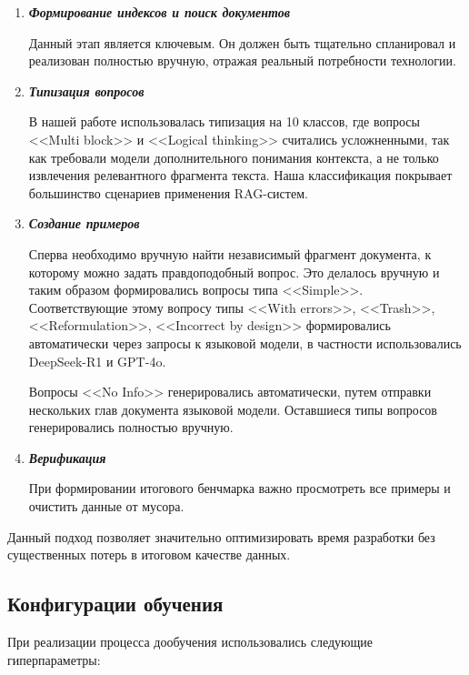 \begin{enumerate}
    \item \textbf{\textit{Формирование индексов и поиск документов}}

        Данный этап является ключевым. Он должен быть тщательно спланировал и реализован полностью вручную, отражая реальный потребности технологии.

    \item \textbf{\textit{Типизация вопросов}}

        В нашей работе использовалась типизация на 10 классов, где вопросы <<Multi block>> и <<Logical thinking>> считались усложненными, так как требовали модели дополнительного понимания контекста, а не только извлечения релевантного фрагмента текста. Наша классификация покрывает большинство сценариев применения RAG-систем.

    \item \textbf{\textit{Создание примеров}}

        Сперва необходимо вручную найти независимый фрагмент документа, к которому можно задать правдоподобный вопрос. Это делалось вручную и таким образом формировались вопросы типа <<Simple>>. Соответствующие этому вопросу типы <<With errors>>, <<Trash>>, <<Reformulation>>, <<Incorrect by design>> формировались автоматически через запросы к языковой модели, в частности использовались DeepSeek-R1 и GPT-4o.

        Вопросы <<No Info>> генерировались автоматически, путем отправки нескольких глав документа языковой модели. Оставшиеся типы вопросов генерировались полностью вручную.

    \item \textbf{\textit{Верификация}}

        При формировании итогового бенчмарка важно просмотреть все примеры и очистить данные от мусора.
    
\end{enumerate}

Данный подход позволяет значительно оптимизировать время разработки без существенных потерь в итоговом качестве данных.



\subsection{Конфигурации обучения}
\label{subsec:config} 

При реализации процесса дообучения использовались следующие гиперпараметры:  

